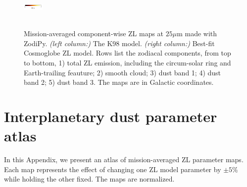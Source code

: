 \documentclass[twocolumn]{aa}
\begin{document}
\begin{figure}[hbt]
{    \includegraphics[width=1cm,angle=90]{figs/comp_maps/cbar_2.pdf}%
    }\\
    \\
    \caption{Mission-averaged component-wise ZL maps at $25\mu$m made with ZodiPy. 
    \textit{(left column:)} The K98 model. \textit{(right column:)} Best-fit Cosmoglobe ZL model.
    Rows list the zodiacal components, from top to bottom, 1) total ZL emission, including the 
    circum-solar ring and Earth-trailing feauture; 2) smooth cloud; 3) dust band 1; 4) 
    dust band 2; 5) dust band 3. The maps are in Galactic coordinates.}
    \label{fig:mission-averaged-comp-maps}
\end{figure}

\clearpage
\section{Interplanetary dust parameter atlas}
\label{sec:param-atlas}
In this Appendix, we present an atlas of mission-averaged ZL parameter maps.
Each map represents the effect of changing one ZL model parameter by $\pm 5\%$ while holding the other fixed. The maps are normalized.
\end{document}
